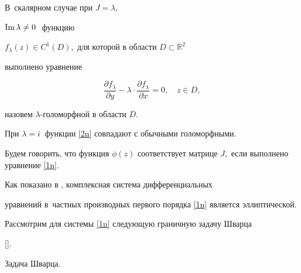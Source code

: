 \hypertarget{nik:def2}{}

\begin{definition}[2]В~скалярном случае при $ J=\lambda,$

${\rm Im}\,\lambda\ne 0~$ функцию

$ f_\lambda(z)\in C^1(D),$ для которой в   области  $ D\subset\mathbb{R}^2$

выполнено уравнение

\begin{equation}

\frac{\partial f_\lambda}{\partial y}-\lambda\cdot

\frac{\partial f_\lambda}{\partial x}=0,\quad z\in D,

\label{2n}

\end{equation}

  назовем      $ \lambda$-голоморфной в области $ D.$

  \end{definition}





\smallskip



При $\lambda=i~$  функции \eqref{2n} совпадают с обычными голоморфными.



\smallskip



\begin{definition}[3] Будем говорить, что функция $ \phi(z)$ соответствует матрице $ J,$ если  выполнено  уравнение  \eqref{1n}.

\end{definition}



\smallskip



Как показано в  \cite{2Nk-Nk2}, комплексная система дифференциальных

уравнений в~частных производных первого порядка \eqref{1n} является эллиптической.

 Рассмотрим для системы \eqref{1n}   следующую граничную  задачу Шварца

  [].



\smallskip

{\small\sc Задача Шварца.}

